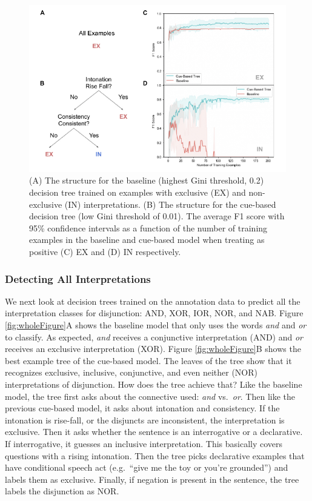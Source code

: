 \documentclass[
  ,man,floatsintext]{apa6}
\begin{document}
\begin{figure}
\centering
\includegraphics{figs/binaryFigure-1.pdf}
\caption{\label{fig:binaryFigure}(A) The structure for the baseline (highest Gini threshold, 0.2) decision tree trained on examples with exclusive (EX) and non-exclusive (IN) interpretations. (B) The structure for the cue-based decision tree (low Gini threshold of 0.01). The average F1 score with 95\% confidence intervals as a function of the number of training examples in the baseline and cue-based model when treating as positive (C) EX and (D) IN respectively.}
\end{figure}

\hypertarget{detecting-all-interpretations}{%
\subsubsection{Detecting All Interpretations}\label{detecting-all-interpretations}}

We next look at decision trees trained on the annotation data to predict all the interpretation classes for disjunction: AND, XOR, IOR, NOR, and NAB. Figure \ref{fig:wholeFigure}A shows the baseline model that only uses the words \emph{and} and \emph{or} to classify. As expected, \emph{and} receives a conjunctive interpretation (AND) and \emph{or} receives an exclusive interpretation (XOR). Figure \ref{fig:wholeFigure}B shows the best example tree of the cue-based model. The leaves of the tree show that it recognizes exclusive, inclusive, conjunctive, and even neither (NOR) interpretations of disjunction. How does the tree achieve that? Like the baseline model, the tree first asks about the connective used: \emph{and} vs.~\emph{or}. Then like the previous cue-based model, it asks about intonation and consistency. If the intonation is rise-fall, or the disjuncts are inconsistent, the interpretation is exclusive. Then it asks whether the sentence is an interrogative or a declarative. If interrogative, it guesses an inclusive interpretation. This basically covers questions with a rising intonation. Then the tree picks declarative examples that have conditional speech act (e.g.~``give me the toy or you're grounded'') and labels them as exclusive. Finally, if negation is present in the sentence, the tree labels the disjunction as NOR.
\end{document}
